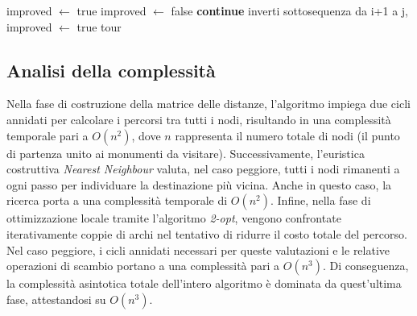 \vspace{-15pt}

\begin{algorithm}[H]
\caption{2-opt}
\begin{algorithmic}[1]
    \State improved $\gets$ true
        \State improved $\gets$ false
                 \textbf{continue} \EndIf
                 \State inverti sottosequenza da i+1 a j, improved $\gets$ true
                \EndIf
            \EndFor
        \EndFor
    \EndWhile
    \State \Return tour
\EndFunction
\end{algorithmic}
\end{algorithm}

\subsection*{Analisi della complessità}
\vspace{-5pt}
Nella fase di costruzione della matrice delle distanze, l'algoritmo impiega due cicli annidati per calcolare i percorsi tra tutti i nodi, risultando in una complessità temporale pari a $O(n^2)$, dove $n$ rappresenta il numero totale di nodi (il punto di partenza unito ai monumenti da visitare). Successivamente, l'euristica costruttiva \textit{Nearest Neighbour} valuta, nel caso peggiore, tutti i nodi rimanenti a ogni passo per individuare la destinazione più vicina. Anche in questo caso, la ricerca porta a una complessità temporale di $O(n^2)$. Infine, nella fase di ottimizzazione locale tramite l'algoritmo \textit{2-opt}, vengono confrontate iterativamente coppie di archi nel tentativo di ridurre il costo totale del percorso. Nel caso peggiore, i cicli annidati necessari per queste valutazioni e le relative operazioni di scambio portano a una complessità pari a $O(n^3)$. Di conseguenza, la complessità asintotica totale dell'intero algoritmo è dominata da quest'ultima fase, attestandosi su $O(n^3)$.